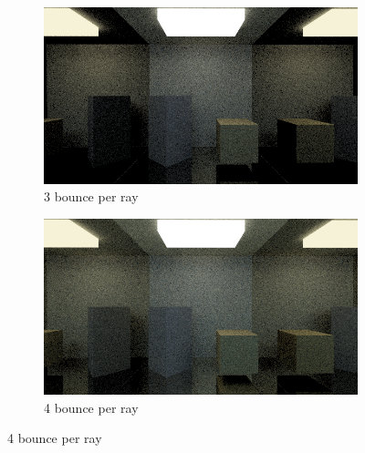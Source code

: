 \documentclass[titlepage,12pt]{report}
\begin{document}
\begin{figure}[H]
	\medskip
	\begin{subfigure}{.48\textwidth}
		\centering
		\includegraphics[scale=0.315]{media/mirrors_rect/cornell_mirrors_3.png}	
		\caption{3 bounce per ray}
		\label{mr_rect_3}
	\end{subfigure}		
	\begin{subfigure}{.48\textwidth}
		\centering
		\includegraphics[scale=0.315]{media/mirrors_rect/cornell_mirrors_4.png}
		\caption{4 bounce per ray}
		\label{mr_rect_4}
	\end{subfigure}
	

\end{figure}
\end{document}
